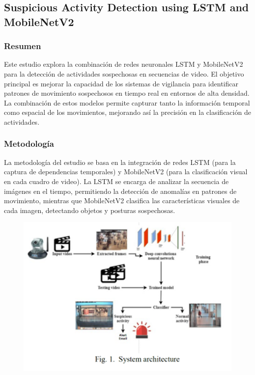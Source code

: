 \subsection{Suspicious Activity Detection using LSTM and MobileNetV2}

\subsubsection{Resumen}
Este estudio explora la combinación de redes neuronales LSTM y MobileNetV2 para la detección de actividades sospechosas en secuencias de video. El objetivo principal es mejorar la capacidad de los sistemas de vigilancia para identificar patrones de movimiento sospechosos en tiempo real en entornos de alta densidad. La combinación de estos modelos permite capturar tanto la información temporal como espacial de los movimientos, mejorando así la precisión en la clasificación de actividades.

\subsubsection{Metodología}
La metodología del estudio se basa en la integración de redes LSTM (para la captura de dependencias temporales) y MobileNetV2 (para la clasificación visual en cada cuadro de video). La LSTM se encarga de analizar la secuencia de imágenes en el tiempo, permitiendo la detección de anomalías en patrones de movimiento, mientras que MobileNetV2 clasifica las características visuales de cada imagen, detectando objetos y posturas sospechosas.

\begin{figure}[h] %
    \centering
    \includegraphics[width=1.0\textwidth]{4/met2.png} %
    \label{fig:ejemplo} %
\end{figure}

